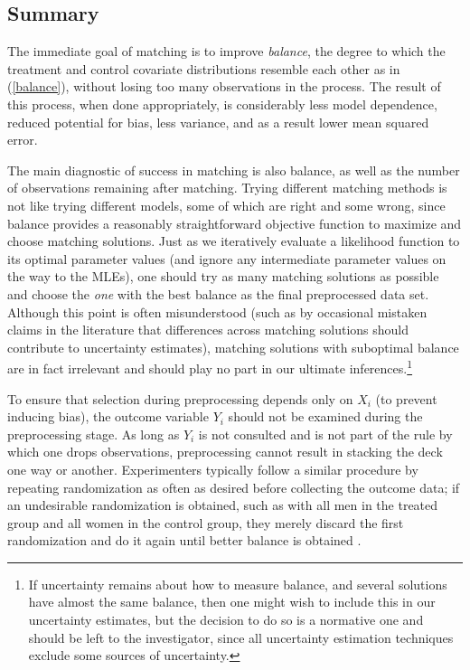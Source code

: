 \documentclass[11pt,titlepage]{article}
\begin{document}
\subsection{Summary}
The immediate goal of matching is to improve \emph{balance}, the
degree to which the treatment and control covariate distributions
resemble each other as in (\ref{balance}), without losing too many
observations in the process.  The result of this process, when done
appropriately, is considerably less model dependence, reduced
potential for bias, less variance, and as a result lower mean squared
error.

The main diagnostic of success in matching is also balance, as well as
the number of observations remaining after matching.  Trying different
matching methods is not like trying different models, some of which
are right and some wrong, since balance provides a reasonably
straightforward objective function to maximize and choose matching
solutions.  Just as we iteratively evaluate a likelihood function to
its optimal parameter values (and ignore any intermediate parameter
values on the way to the MLEs), one should try as many matching
solutions as possible and choose the \emph{one} with the best balance
as the final preprocessed data set.  Although this point is often
misunderstood (such as by occasional mistaken claims in the literature
that differences across matching solutions should contribute to
uncertainty estimates), matching solutions with suboptimal balance are
in fact irrelevant and should play no part in our ultimate
inferences.\footnote{If uncertainty remains about how to measure
  balance, and several solutions have almost the same balance, then
  one might wish to include this in our uncertainty estimates, but the
  decision to do so is a normative one and should be left to the
  investigator, since all uncertainty estimation techniques exclude
  some sources of uncertainty.}

To ensure that selection during preprocessing depends only on $X_i$
(to prevent inducing bias), the outcome variable $Y_i$ should not be
examined during the preprocessing stage.  As long as $Y_i$ is not
consulted and is not part of the rule by which one drops observations,
preprocessing cannot result in stacking the deck one way or another.
Experimenters typically follow a similar procedure by repeating
randomization as often as desired before collecting the outcome data;
if an undesirable randomization is obtained, such as with all men in
the treated group and all women in the control group, they merely
discard the first randomization and do it again until better balance
is obtained \citep[see][]{Rubin01}.
\end{document}
